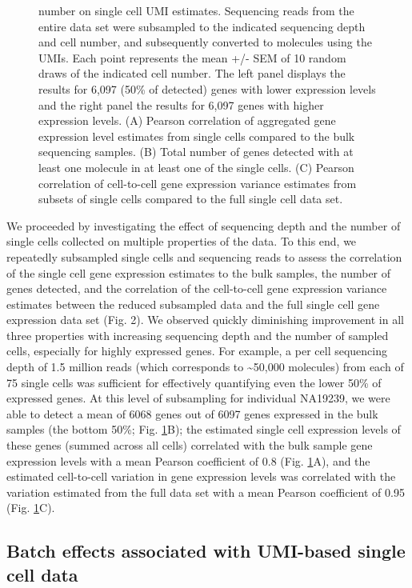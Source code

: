 \begin{figure}[htbp]
{{number on single cell UMI estimates.} Sequencing reads from the entire
data set were subsampled to the indicated sequencing depth and cell
number, and subsequently converted to molecules using the UMIs. Each
point represents the mean +/- SEM of 10 random draws of the indicated
cell number. The left panel displays the results for 6,097 (50\% of
detected) genes with lower expression levels and the right panel the
results for 6,097 genes with higher expression levels. (A) Pearson
correlation of aggregated gene expression level estimates from single
cells compared to the bulk sequencing samples. (B) Total number of genes
detected with at least one molecule in at least one of the single cells.
(C) Pearson correlation of cell-to-cell gene expression variance
estimates from subsets of single cells compared to the full single cell
data set.}
\label{fig:subsample}
\end{figure}

We proceeded by investigating the effect of sequencing depth and the
number of single cells collected on multiple properties of the data. To
this end, we repeatedly subsampled single cells and sequencing reads to
assess the correlation of the single cell gene expression estimates to
the bulk samples, the number of genes detected, and the correlation of
the cell-to-cell gene expression variance estimates between the reduced
subsampled data and the full single cell gene expression data set (Fig.
2). We observed quickly diminishing improvement in all three properties
with increasing sequencing depth and the number of sampled cells,
especially for highly expressed genes. For example, a per cell
sequencing depth of 1.5 million reads (which corresponds to
\textasciitilde{}50,000 molecules) from each of 75 single cells was
sufficient for effectively quantifying even the lower 50\% of expressed
genes. At this level of subsampling for individual NA19239, we were able
to detect a mean of 6068 genes out of 6097 genes expressed in the bulk
samples (the bottom 50\%; Fig. \ref{fig:subsample}B); the estimated single cell expression
levels of these genes (summed across all cells) correlated with the bulk
sample gene expression levels with a mean Pearson coefficient of 0.8
(Fig. \ref{fig:subsample}A), and the estimated cell-to-cell variation in gene expression
levels was correlated with the variation estimated from the full data
set with a mean Pearson coefficient of 0.95 (Fig. \ref{fig:subsample}C).

\subsection{Batch effects associated with UMI-based single cell
data}\label{batch-effects-associated-with-umi-based-single-cell-data}


